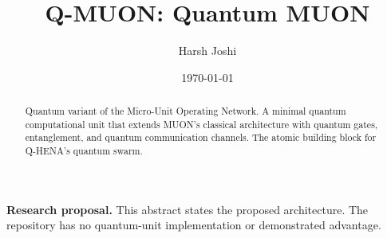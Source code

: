 \documentclass[twocolumn]{article}
\title{Q-MUON: Quantum MUON}
\author{Harsh Joshi}
\date{\today}
\begin{document}
\maketitle

\begin{abstract}
Quantum variant of the Micro-Unit Operating Network. A minimal quantum
computational unit that extends MUON's classical architecture with quantum
gates, entanglement, and quantum communication channels. The atomic
building block for Q-HENA's quantum swarm.
\end{abstract}

\noindent\textbf{Research proposal.} This abstract states the proposed architecture. The repository has no quantum-unit implementation or demonstrated advantage.



\end{document}
